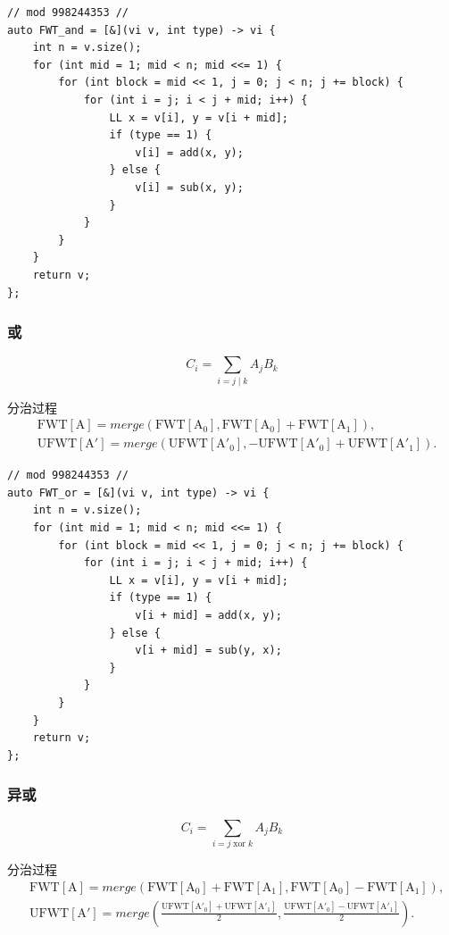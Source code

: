 \documentclass[UTF8, a4paper, titlepage, twoside]{ctexart}
\begin{document}
\begin{lstlisting}[style=cpp]
// mod 998244353 //
auto FWT_and = [&](vi v, int type) -> vi {
    int n = v.size();
    for (int mid = 1; mid < n; mid <<= 1) {
        for (int block = mid << 1, j = 0; j < n; j += block) {
            for (int i = j; i < j + mid; i++) {
                LL x = v[i], y = v[i + mid];
                if (type == 1) {
                    v[i] = add(x, y);
                } else {
                    v[i] = sub(x, y);
                }
            }
        }
    }
    return v;
};
\end{lstlisting}

\subsubsection{ 或 }
$$ C_i = \sum\limits_{i = j \mid k} A_j B_k $$

分治过程
$$
\begin{aligned}
& \operatorname{FWT[A]} = merge(\operatorname{FWT[A_0]}, \operatorname{FWT[A_0]} + \operatorname{FWT[A_1]}), \\
& \operatorname{UFWT[A']} = merge(\operatorname{UFWT[A'_0]}, -\operatorname{UFWT[A'_0]} + \operatorname{UFWT[A'_1]}).
\end{aligned}
$$

\begin{lstlisting}[style=cpp]
// mod 998244353 //
auto FWT_or = [&](vi v, int type) -> vi {
    int n = v.size();
    for (int mid = 1; mid < n; mid <<= 1) {
        for (int block = mid << 1, j = 0; j < n; j += block) {
            for (int i = j; i < j + mid; i++) {
                LL x = v[i], y = v[i + mid];
                if (type == 1) {
                    v[i + mid] = add(x, y);
                } else {
                    v[i + mid] = sub(y, x);
                }
            }
        }
    }
    return v;
};
\end{lstlisting}

\subsubsection{ 异或 }
$$ C_i = \sum\limits_{i = j \operatorname{xor} k} A_j B_k $$

分治过程
$$
\begin{aligned}
& \operatorname{FWT[A]} = merge(\operatorname{FWT[A_0]} + \operatorname{FWT[A_1]}, \operatorname{FWT[A_0]} - \operatorname{FWT[A_1]}), \\
& \operatorname{UFWT[A']} = merge(\frac{\operatorname{UFWT[A'_0]} + \operatorname{UFWT[A'_1]}}{2}, \frac{\operatorname{UFWT[A'_0]} - \operatorname{UFWT[A'_1]}}{2}).
\end{aligned}
$$
\end{document}
